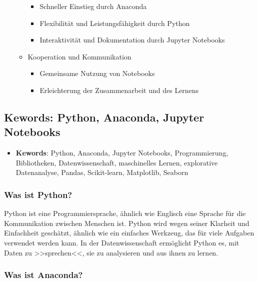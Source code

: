\documentclass{vorlage-design-main}
\begin{document}
\begin{enumerate}
\begin{itemize}
    \begin{itemize}

    \item
      Schneller Einstieg durch Anaconda
    \item
      Flexibilität und Leistungsfähigkeit durch Python
    \item
      Interaktivität und Dokumentation durch Jupyter Notebooks
    \end{itemize}
  \item
    Kooperation und Kommunikation

    \begin{itemize}

    \item
      Gemeinsame Nutzung von Notebooks
    \item
      Erleichterung der Zusammenarbeit und des Lernens
    \end{itemize}
  \end{itemize}
\end{enumerate}

\newpage

\subsection{Kewords: Python, Anaconda, Jupyter
Notebooks}\label{kewords-python-anaconda-jupyter-notebooks}

\begin{itemize}

\item
  \textbf{Kewords}: Python, Anaconda, Jupyter Notebooks, Programmierung,
  Bibliotheken, Datenwissenschaft, maschinelles Lernen, explorative
  Datenanalyse, Pandas, Scikit-learn, Matplotlib, Seaborn
\end{itemize}

\subsubsection{Was ist Python?}\label{was-ist-python}

Python ist eine Programmiersprache, ähnlich wie Englisch eine Sprache
für die Kommunikation zwischen Menschen ist. Python wird wegen seiner
Klarheit und Einfachheit geschätzt, ähnlich wie ein einfaches Werkzeug,
das für viele Aufgaben verwendet werden kann. In der Datenwissenschaft
ermöglicht Python es, mit Daten zu >>sprechen<<, sie zu analysieren und
aus ihnen zu lernen.

\subsubsection{Was ist Anaconda?}\label{was-ist-anaconda}
\end{document}
